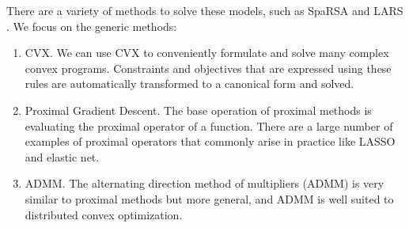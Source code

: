 \documentclass[
10pt, %
a4paper, %
oneside, %
headinclude,footinclude, %
BCOR5mm, %
]{scrartcl}
\begin{document}
There are a variety of methods to solve these models, such as SpaRSA 
\cite{wright2009sparse} and LARS \cite{efron2004least}.
We focus on the generic methods:
\begin{enumerate}[noitemsep] 
	\item CVX. 
	We can use CVX \cite{cvx} to conveniently formulate and solve many 
complex convex programs. Constraints and objectives that are expressed using 
these rules are automatically transformed to a canonical form and solved.

	\item Proximal Gradient Descent. The base operation of proximal methods is 
evaluating the proximal operator of a function. There are a large number of 
examples of proximal operators that commonly arise in practice like LASSO and 
elastic net. 

	\item ADMM. 
	The alternating direction method of multipliers (ADMM) 
\cite{boyd2011distributed} is very similar to proximal methods but more 
general, and ADMM is well suited to distributed convex optimization.



\end{enumerate}
\end{document}
